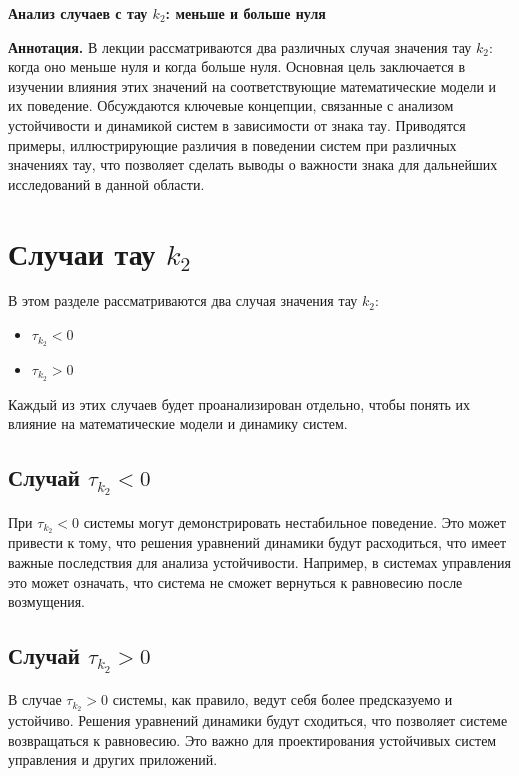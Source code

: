 \documentclass[a4paper]{article}
\begin{document}
\begin{center}
{\LARGE \textbf{Анализ случаев с тау \( k_2 \): меньше и больше нуля}}\\[1em]
\end{center}

\textbf{Аннотация.} В лекции рассматриваются два различных случая значения тау \( k_2 \): когда оно меньше нуля и когда больше нуля. Основная цель заключается в изучении влияния этих значений на соответствующие математические модели и их поведение. Обсуждаются ключевые концепции, связанные с анализом устойчивости и динамикой систем в зависимости от знака тау. Приводятся примеры, иллюстрирующие различия в поведении систем при различных значениях тау, что позволяет сделать выводы о важности знака для дальнейших исследований в данной области.

\section{Случаи тау \( k_2 \)}

В этом разделе рассматриваются два случая значения тау \( k_2 \): 

\begin{itemize}
    \item \( \tau_{k_2} < 0 \)
    \item \( \tau_{k_2} > 0 \)
\end{itemize}

Каждый из этих случаев будет проанализирован отдельно, чтобы понять их влияние на математические модели и динамику систем.

\subsection{Случай \( \tau_{k_2} < 0 \)}

При \( \tau_{k_2} < 0 \) системы могут демонстрировать нестабильное поведение. Это может привести к тому, что решения уравнений динамики будут расходиться, что имеет важные последствия для анализа устойчивости. Например, в системах управления это может означать, что система не сможет вернуться к равновесию после возмущения.

\subsection{Случай \( \tau_{k_2} > 0 \)}

В случае \( \tau_{k_2} > 0 \) системы, как правило, ведут себя более предсказуемо и устойчиво. Решения уравнений динамики будут сходиться, что позволяет системе возвращаться к равновесию. Это важно для проектирования устойчивых систем управления и других приложений.
\end{document}
